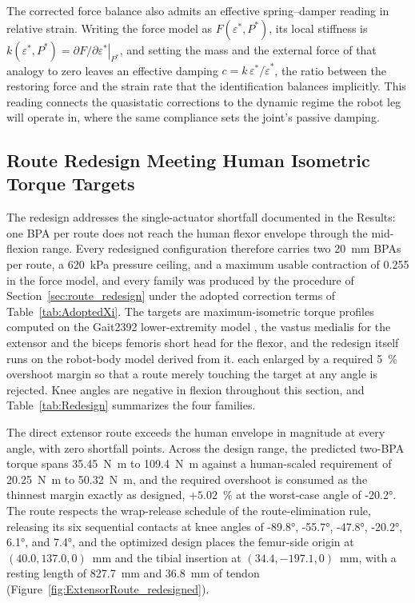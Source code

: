 The corrected force balance also admits an effective spring--damper reading in relative strain. Writing the force model as $F(\varepsilon^{*}, P^{*})$, its local stiffness is $k(\varepsilon^{*}, P^{*}) = \left.\partial F/\partial\varepsilon^{*}\right|_{P^{*}}$, and setting the mass and the external force of that analogy to zero leaves an effective damping $c = k\,\varepsilon^{*}/\dot{\varepsilon}^{*}$, the ratio between the restoring force and the strain rate that the identification balances implicitly. This reading connects the quasistatic corrections to the dynamic regime the robot leg will operate in, where the same compliance sets the joint's passive damping.

\subsection{Route Redesign Meeting Human Isometric Torque Targets}\label{sec:route_redesign_results}

The redesign addresses the single-actuator shortfall documented in the Results: one BPA per route does not reach the human flexor envelope through the mid-flexion range. Every redesigned configuration therefore carries two \diameter\qty{20}{\mm} BPAs per route, a \qty{620}{\kPa} pressure ceiling, and a maximum usable contraction of 0.255 in the force model, and every family was produced by the procedure of Section~\ref{sec:route_redesign} under the adopted correction terms of Table~\ref{tab:AdoptedXi}. The targets are maximum-isometric torque profiles computed on the Gait2392 lower-extremity model \citep{delp_opensim_2007, seth_opensim_2018}, the vastus medialis for the extensor and the biceps femoris short head for the flexor, and the redesign itself runs on the robot-body model derived from it. each enlarged by a required \qty{5}{\percent} overshoot margin so that a route merely touching the target at any angle is rejected. Knee angles are negative in flexion throughout this section, and Table~\ref{tab:Redesign} summarizes the four families.

The direct extensor route exceeds the human envelope in magnitude at every angle, with zero shortfall points. Across the design range, the predicted two-BPA torque spans \qty{35.45}{\newton\meter} to \qty{109.4}{\newton\meter} against a human-scaled requirement of \qty{20.25}{\newton\meter} to \qty{50.32}{\newton\meter}, and the required overshoot is consumed as the thinnest margin exactly as designed, $+5.02$~\% at the worst-case angle of \ang{-20.2}. The route respects the wrap-release schedule of the route-elimination rule, releasing its six sequential contacts at knee angles of \ang{-89.8}, \ang{-55.7}, \ang{-47.8}, \ang{-20.2}, \ang{6.1}, and \ang{7.4}, and the optimized design places the femur-side origin at $(40.0, 137.0, 0)$~mm and the tibial insertion at $(34.4, -197.1, 0)$~mm, with a resting length of \qty{827.7}{\mm} and \qty{36.8}{\mm} of tendon (Figure~\ref{fig:ExtensorRoute_redesigned}).

